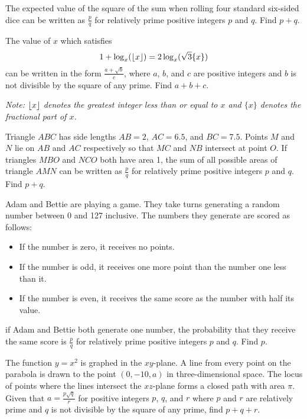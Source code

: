 \documentclass[11pt]{scrartcl}
\begin{document}
\begin{problem}
    The expected value of the square of the sum when rolling four standard six-sided dice can be written as $\frac{p}{q}$ for relatively prime positive integers $p$ and $q$. Find $p + q$.
\end{problem}

\begin{problem}
    The value of $x$ which satisfies
    \[1 + \log_{x}(\left\lfloor x \right\rfloor) = 2\log_{x}(\sqrt{3}\{x\})\]
    can be written in the form $\frac{a + \sqrt{b}}{c}$, where $a$, $b$, and $c$ are positive integers and $b$ is not divisible by the square of any prime. Find $a + b + c$.
    
    \emph{Note: $\left\lfloor x \right\rfloor$ denotes the greatest integer less than or equal to $x$ and $\{x\}$ denotes the fractional part of $x$.}    
\end{problem}

\begin{problem}
    Triangle $ABC$ has side lengths $AB = 2$, $AC = 6.5$, and $BC = 7.5$. Points $M$ and $N$ lie on $AB$ and $AC$ respectively so that $MC$ and $NB$ intersect at point $O$. If triangles $MBO$ and $NCO$ both have area 1, the sum of all possible areas of triangle $AMN$ can be written as $\frac{p}{q}$ for relatively prime positive integers $p$ and $q$. Find $p + q$. 
\end{problem}

\begin{problem}
    Adam and Bettie are playing a game. They take turns generating a random number between 0 and 127 inclusive. The numbers they generate are scored as follows:
    \begin{itemize}
        \item If the number is zero, it receives no points.
        \item If the number is odd, it receives one more point than the number one less than it.
        \item If the number is even, it receives the same score as the number with half its value.
    \end{itemize}
    if Adam and Bettie both generate one number, the probability that they receive the same score is $\frac{p}{q}$ for relatively prime positive integers $p$ and $q$. Find $p$.
\end{problem}

\begin{problem}
    The function $y = x^{2}$ is graphed in the $xy$-plane. A line from every point on the parabola is drawn to the point $(0, -10, a)$ in three-dimensional space. The locus of points where the lines intersect the $xz$-plane forms a closed path with area $\pi$. Given that $a = \frac{p\sqrt{q}}{r}$ for positive integers $p$, $q$, and $r$ where $p$ and $r$ are relatively prime and $q$ is not divisible by the square of any prime, find $p + q + r$.
\end{problem}
\end{document}
